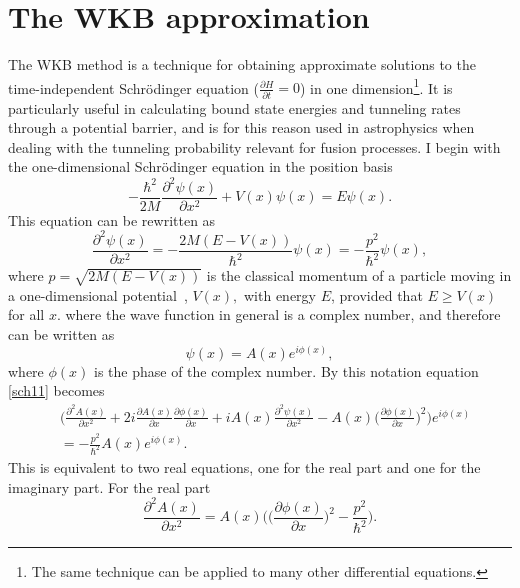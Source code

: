 \section{The WKB approximation}
The WKB method is a technique for obtaining approximate solutions to the time-independent Schrödinger equation ($\frac{\partial H}{\partial t}=0$) in one dimension\footnote{The same technique can be applied to many other differential equations.}. It is particularly useful in calculating bound state energies and tunneling rates through a potential barrier, and is for this reason used in astrophysics when dealing with the tunneling probability relevant for fusion processes. \newline
I begin with the one-dimensional Schrödinger equation in the position basis
\begin{equation}
	-\frac{\hbar^2}{2M}\frac{\partial^2\psi(x)}{\partial x^2}+V(x)\psi(x)=E\psi(x).
	\label{sch10}
\end{equation} 
This equation can be rewritten as
\begin{equation}
	\frac{\partial^2\psi(x)}{\partial x^2}=-\frac{2M(E-V(x))}{\hbar^2}\psi(x)=-\frac{p^2}{\hbar^2}\psi(x),
	\label{sch11}
\end{equation} 
where $p=\sqrt{2M(E-V(x))}$ is the classical momentum of a particle moving in a one-dimensional potential~\citep[p.346]{Griffiths}, $V(x),$ with energy $E$, provided that $E\geq V(x)$ for all $x$. where the wave function in general is a complex number, and therefore can be written as
\begin{equation}
	\psi(x)=A(x)e^{i\phi(x)},
\end{equation} 
where $\phi(x)$ is the phase of the complex number. By this notation equation \eqref{sch11} becomes
\begin{equation}
	\begin{split}
		&\bigg(\frac{\partial^2A(x)}{\partial x^2}+2i\frac{\partial A(x)}{\partial x}\frac{\partial \phi(x)}{\partial x}+iA(x)\frac{\partial^2\psi(x)}{\partial x^2}-A(x)\bigg(\frac{\partial \phi(x)}{\partial x}\bigg)^2\bigg)e^{i\phi(x)}\\
		&=-\frac{p^2}{\hbar^2}A(x)e^{i\phi(x)}.
	\end{split}
	\label{sch12}
\end{equation} 
This is equivalent to two real equations, one for the real part and one for the imaginary part. For the real part
\begin{equation}
	\frac{\partial^2A(x)}{\partial x^2}=A(x)\bigg(\bigg(\frac{\partial\phi(x)}{\partial x}\bigg)^2-\frac{p^2}{\hbar^2}\bigg).
	\label{sch13}
\end{equation} 
